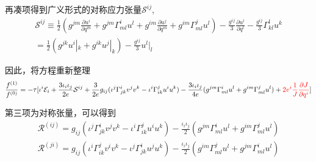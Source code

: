 \documentclass[LBMDerivation.tex]{subfiles}
\begin{document}
再凑项得到广义形式的对称应力张量$\mathcal{S}^{ij}$,
\begin{equation}
  \begin{gathered}
    \mathcal{S}^{ij}   \equiv \frac{1}{2} (g^{jm} \frac{\partial u^i}{\partial q^m}+g^{jm}\Gamma_{ml}^i u^l+g^{im} \frac{\partial u^j}{\partial q^m}+g^{im}\Gamma_{ml}^j u^l) -\frac{g^{ij}}{3}\frac{\partial u^l}{\partial q^l}-\frac{g^{ij}}{3} \Gamma_{kl}^l u^k\\=\frac{1}{2} (g^{jk} u^i|_k+g^{ik} u^j|_k) -\frac{g^{ij}}{3}u^l|_l
  \end{gathered}
\end{equation}




因此，将方程重新整理
\begin{equation}
  \begin{gathered}
    \frac{f^{(1)}}{f^{(0)}}=
    -\tau [\iota^i \mathcal{E}_i
    +\frac{3\iota_i \iota_j}{2e}\mathcal{S}^{ij}
    + \frac{3}{2e} g_{ij} (\iota^j\Gamma_{j k}^{i} v^j v^k - \iota^i\Gamma_{i k}^{j} u^i u^k) - \frac{3\iota_i\iota_j}{4e}(g^{jm}\Gamma_{ml}^i u^l + g^{im}\Gamma_{ml}^j u^l) +{\color{red}  2v^i  \frac{1}{J}\frac{\partial J}{\partial q^i}}
    ]
  \end{gathered}
\end{equation}



第三项为对称张量，可以得到
\begin{equation}
  \begin{gathered}
    \mathcal{R}^{(ij)} =g_{ij} (\iota^j\Gamma_{j k}^{i} v^j v^k - \iota^i\Gamma_{i k}^{j} u^i u^k) - \frac{\iota_i\iota_j}{2}(g^{jm}\Gamma_{ml}^i u^l + g^{im}\Gamma_{ml}^j u^l) \\
    \mathcal{R}^{(ji)}= g_{ij} (\iota^i\Gamma_{i k}^{j} v^i v^k - \iota^j \Gamma_{j k}^{i} u^j u^k) - \frac{\iota_i\iota_j}{2}(g^{im}\Gamma_{ml}^j u^l + g^{jm}\Gamma_{ml}^i u^l) \\
  \end{gathered}
\end{equation}
\end{document}
